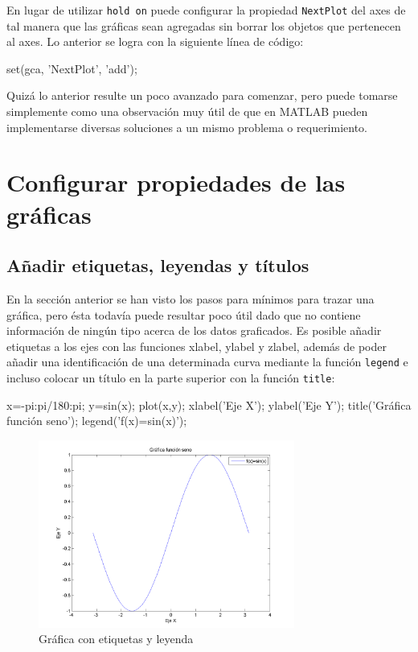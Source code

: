En lugar de utilizar \texttt{hold on} puede configurar la propiedad
\texttt{NextPlot} del axes de tal manera que las gráficas sean agregadas
sin borrar los objetos que pertenecen al axes. Lo anterior se logra con
la siguiente línea de código:

\begin{matlab}
set(gca, 'NextPlot', 'add');
\end{matlab}

Quizá lo anterior resulte un poco avanzado para comenzar, pero puede
tomarse simplemente como una observación muy útil de que en MATLAB
pueden implementarse diversas soluciones a un mismo problema o
requerimiento.

\section{Configurar propiedades de las gráficas}

\subsection{Añadir etiquetas, leyendas y títulos}

En la sección anterior se han visto los pasos para mínimos para trazar
una gráfica, pero ésta todavía puede resultar poco útil dado que no
contiene información de ningún tipo acerca de los datos graficados. Es
posible añadir etiquetas a los ejes con las funciones xlabel, ylabel y
zlabel, además de poder añadir una identificación de una determinada
curva mediante la función \texttt{legend} e incluso colocar un título en
la parte superior con la función \texttt{title}:

\begin{matlab}
x=-pi:pi/180:pi;
y=sin(x);
plot(x,y);
xlabel('Eje X');
ylabel('Eje Y');
title('Gráfica función seno');
legend('f(x)=sin(x)');
\end{matlab}

\begin{figure}[htbp]
    \centering
    \includegraphics[width=0.75\textwidth]{images/ch4/img_4_4.png}
    \caption{Gráfica con etiquetas y leyenda}
    \label{fig:img_4_4}
\end{figure}

